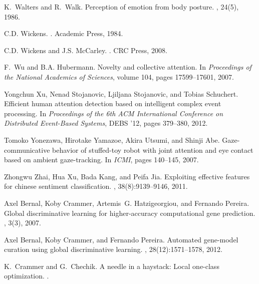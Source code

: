 \documentclass[12pt]{article}
\begin{document}
\begin{small}
\begin{thebibliography}{10}
K.~Walters and R.~Walk.
\newblock Perception of emotion from body posture.
, 24(5), 1986.

C.D. Wickens.
.
\newblock Academic Press, 1984.

C.D. Wickens and J.S. McCarley.
.
\newblock CRC Press, 2008.

F.~Wu and B.A. Hubermann.
\newblock Novelty and collective attention.
\newblock In {\em Proceedings of the National Academics of Sciences}, volume
  104, pages 17599--17601, 2007.

Yongchun Xu, Nenad Stojanovic, Ljiljana Stojanovic, and Tobias Schuchert.
\newblock Efficient human attention detection based on intelligent complex
  event processing.
\newblock In {\em Proceedings of the 6th ACM International Conference on
  Distributed Event-Based Systems}, DEBS '12, pages 379--380, 2012.

Tomoko Yonezawa, Hirotake Yamazoe, Akira Utsumi, and Shinji Abe.
\newblock Gaze-communicative behavior of stuffed-toy robot with joint attention
  and eye contact based on ambient gaze-tracking.
\newblock In {\em ICMI}, pages 140--145, 2007.

Zhongwu Zhai, Hua Xu, Bada Kang, and Peifa Jia.
\newblock Exploiting effective features for chinese sentiment classification.
, 38(8):9139--9146, 2011.



Axel Bernal, Koby Crammer, Artemis~G. Hatzigeorgiou, and Fernando Pereira.
\newblock Global discriminative learning for higher-accuracy computational gene
prediction.
, 3(3), 2007.

Axel Bernal, Koby Crammer, and Fernando Pereira.
\newblock Automated gene-model curation using global discriminative learning.
, 28(12):1571--1578, 2012.

K.~Crammer and G.~Chechik.
\newblock A needle in a haystack: Local one-class optimization.
.


\end{thebibliography}
\end{small}
\end{document}

